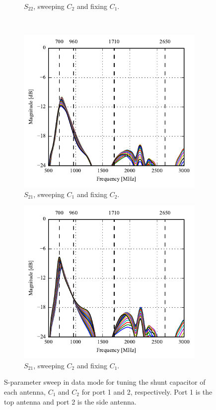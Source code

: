 \begin{figure}[htbp]
\begin{subfigure}[b]{0.49\linewidth}
        \caption{$S_{22}$, sweeping $C_2$ and fixing $C_1$.}
    \end{subfigure}
~
    \begin{subfigure}[b]{0.49\linewidth}
        \centering
        \includegraphics{img/tech_sol/monopole/data_mode/s21_s11}
        \caption{$S_{21}$, sweeping $C_1$ and fixing $C_2$.}
    \end{subfigure}
    \hfill
    \begin{subfigure}[b]{0.49\linewidth}
        \centering
        \includegraphics{img/tech_sol/monopole/data_mode/s21_s22}
        \caption{$S_{21}$, sweeping $C_2$ and fixing $C_1$.}
    \end{subfigure}
    \caption{S-parameter sweep in data mode for tuning the shunt capacitor of each antenna, $C_1$ and $C_2$ for port 1 and 2, respectively. Port 1 is the top antenna and port 2 is the side antenna.}
    \label{fig:sparam_mono_data_mode}
\end{figure}

